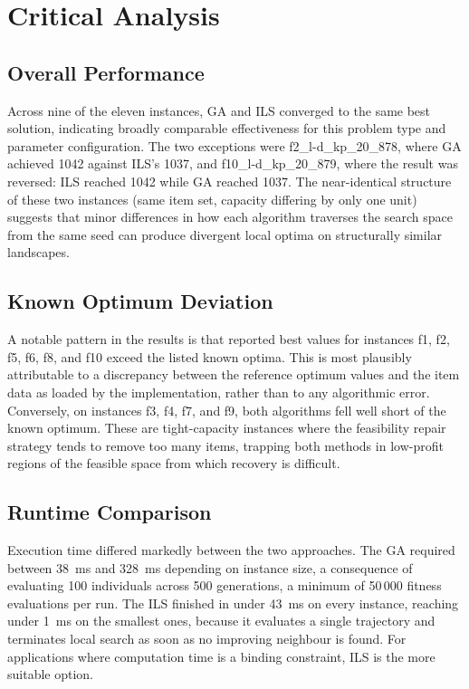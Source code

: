 \documentclass[12pt, a4paper]{article}
\begin{document}
\section{Critical Analysis}

\subsection{Overall Performance}

Across nine of the eleven instances, GA and ILS converged to the same best solution, indicating broadly comparable effectiveness for this problem type and parameter configuration. The two exceptions were f2\_l-d\_kp\_20\_878, where GA achieved 1042 against ILS's 1037, and f10\_l-d\_kp\_20\_879, where the result was reversed: ILS reached 1042 while GA reached 1037. The near-identical structure of these two instances (same item set, capacity differing by only one unit) suggests that minor differences in how each algorithm traverses the search space from the same seed can produce divergent local optima on structurally similar landscapes.

\subsection{Known Optimum Deviation}

A notable pattern in the results is that reported best values for instances f1, f2, f5, f6, f8, and f10 exceed the listed known optima. This is most plausibly attributable to a discrepancy between the reference optimum values and the item data as loaded by the implementation, rather than to any algorithmic error. Conversely, on instances f3, f4, f7, and f9, both algorithms fell well short of the known optimum. These are tight-capacity instances where the feasibility repair strategy tends to remove too many items, trapping both methods in low-profit regions of the feasible space from which recovery is difficult.

\subsection{Runtime Comparison}

Execution time differed markedly between the two approaches. The GA required between 38~ms and 328~ms depending on instance size, a consequence of evaluating 100 individuals across 500 generations, a minimum of 50\,000 fitness evaluations per run. The ILS finished in under 43~ms on every instance, reaching under 1~ms on the smallest ones, because it evaluates a single trajectory and terminates local search as soon as no improving neighbour is found. For applications where computation time is a binding constraint, ILS is the more suitable option.
\end{document}
